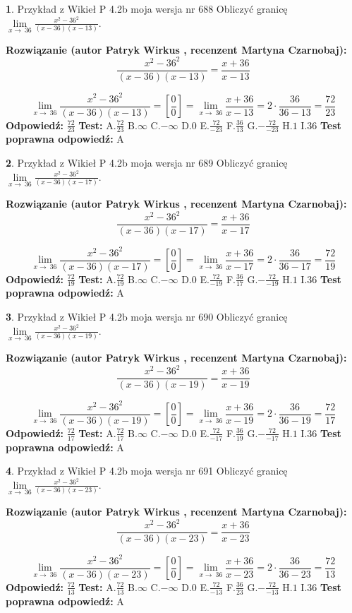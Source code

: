 \documentclass[12pt, a4paper]{article}
\theoremstyle{definition} %
\newtheorem{zad}{}
\newcommand{\zadStart}[1]{\begin{zad}#1\newline}
\newcommand{\zadStop}{\end{zad}}
\newcommand{\rozwStart}[2]{\noindent \textbf{Rozwiązanie (autor #1 , recenzent #2): }\newline}
\newcommand{\rozwStop}{\newline}
\newcommand{\odpStart}{\noindent \textbf{Odpowiedź:}\newline}
\newcommand{\odpStop}{\newline}
\newcommand{\testStart}{\noindent \textbf{Test:}\newline}
\newcommand{\testStop}{\newline}
\newcommand{\kluczStart}{\noindent \textbf{Test poprawna odpowiedź:}\newline}
\newcommand{\kluczStop}{\newline}
\begin{document}
\zadStart{Przykład z Wikieł P 4.2b moja wersja nr 688}
Obliczyć granicę $\lim\limits_{x\to\ 36}\frac{x^{2}-36^{2}}{(x-36)(x-13)}$.
\zadStop
\rozwStart{Patryk Wirkus}{Martyna Czarnobaj}
$$\frac{x^{2}-36^{2}}{(x-36)(x-13)}=\frac{x+36}{x-13}$$

$$\lim\limits_{x\to\ 36}\frac{x^{2}-36^{2}}{(x-36)(x-13)}=[\frac{0}{0}]=\lim\limits_{x\to\ 36}\frac{x+36}{x-13}=2 \cdot \frac{36}{36-13} = \frac{72}{23}$$
\rozwStop
\odpStart
$\frac{72}{23}$
\odpStop
\testStart
A.$\frac{72}{23}$
B.$\infty$
C.$-\infty$
D.$0$
E.$\frac{72}{-23}$
F.$\frac{36}{13}$
G.$-\frac{72}{-23}$
H.$1$
I.$36$
\testStop
\kluczStart
A
\kluczStop



\zadStart{Przykład z Wikieł P 4.2b moja wersja nr 689}
Obliczyć granicę $\lim\limits_{x\to\ 36}\frac{x^{2}-36^{2}}{(x-36)(x-17)}$.
\zadStop
\rozwStart{Patryk Wirkus}{Martyna Czarnobaj}
$$\frac{x^{2}-36^{2}}{(x-36)(x-17)}=\frac{x+36}{x-17}$$

$$\lim\limits_{x\to\ 36}\frac{x^{2}-36^{2}}{(x-36)(x-17)}=[\frac{0}{0}]=\lim\limits_{x\to\ 36}\frac{x+36}{x-17}=2 \cdot \frac{36}{36-17} = \frac{72}{19}$$
\rozwStop
\odpStart
$\frac{72}{19}$
\odpStop
\testStart
A.$\frac{72}{19}$
B.$\infty$
C.$-\infty$
D.$0$
E.$\frac{72}{-19}$
F.$\frac{36}{17}$
G.$-\frac{72}{-19}$
H.$1$
I.$36$
\testStop
\kluczStart
A
\kluczStop



\zadStart{Przykład z Wikieł P 4.2b moja wersja nr 690}
Obliczyć granicę $\lim\limits_{x\to\ 36}\frac{x^{2}-36^{2}}{(x-36)(x-19)}$.
\zadStop
\rozwStart{Patryk Wirkus}{Martyna Czarnobaj}
$$\frac{x^{2}-36^{2}}{(x-36)(x-19)}=\frac{x+36}{x-19}$$

$$\lim\limits_{x\to\ 36}\frac{x^{2}-36^{2}}{(x-36)(x-19)}=[\frac{0}{0}]=\lim\limits_{x\to\ 36}\frac{x+36}{x-19}=2 \cdot \frac{36}{36-19} = \frac{72}{17}$$
\rozwStop
\odpStart
$\frac{72}{17}$
\odpStop
\testStart
A.$\frac{72}{17}$
B.$\infty$
C.$-\infty$
D.$0$
E.$\frac{72}{-17}$
F.$\frac{36}{19}$
G.$-\frac{72}{-17}$
H.$1$
I.$36$
\testStop
\kluczStart
A
\kluczStop



\zadStart{Przykład z Wikieł P 4.2b moja wersja nr 691}
Obliczyć granicę $\lim\limits_{x\to\ 36}\frac{x^{2}-36^{2}}{(x-36)(x-23)}$.
\zadStop
\rozwStart{Patryk Wirkus}{Martyna Czarnobaj}
$$\frac{x^{2}-36^{2}}{(x-36)(x-23)}=\frac{x+36}{x-23}$$

$$\lim\limits_{x\to\ 36}\frac{x^{2}-36^{2}}{(x-36)(x-23)}=[\frac{0}{0}]=\lim\limits_{x\to\ 36}\frac{x+36}{x-23}=2 \cdot \frac{36}{36-23} = \frac{72}{13}$$
\rozwStop
\odpStart
$\frac{72}{13}$
\odpStop
\testStart
A.$\frac{72}{13}$
B.$\infty$
C.$-\infty$
D.$0$
E.$\frac{72}{-13}$
F.$\frac{36}{23}$
G.$-\frac{72}{-13}$
H.$1$
I.$36$
\testStop
\kluczStart
A
\kluczStop
\end{document}
